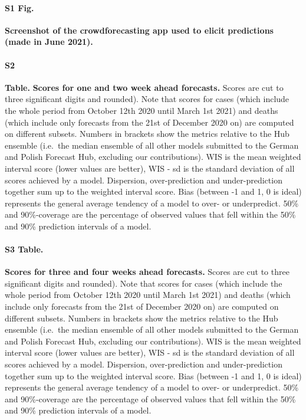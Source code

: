 \documentclass[10pt,letterpaper]{article}
\begin{document}
\paragraph*{S1 Fig.}
\label{fig:screenshot}

\textbf{Screenshot of the crowdforecasting app used to elicit predictions (made in June 2021).}

\paragraph*{S2}

\textbf{Table.} \label{tab:score-table-2}
\textbf{Scores for one and two week ahead forecasts.} Scores are cut to
three significant digits and rounded). Note that scores for cases (which
include the whole period from October 12th 2020 until March 1st 2021)
and deaths (which include only forecasts from the 21st of December 2020
on) are computed on different subsets. Numbers in brackets show the
metrics relative to the Hub ensemble (i.e.~the median ensemble of all
other models submitted to the German and Polish Forecast Hub, excluding
our contributions). WIS is the mean weighted interval score (lower
values are better), WIS - sd is the standard deviation of all scores
achieved by a model. Dispersion, over-prediction and under-prediction
together sum up to the weighted interval score. Bias (between -1 and 1,
0 is ideal) represents the general average tendency of a model to over-
or underpredict. 50\% and 90\%-coverage are the percentage of observed
values that fell within the 50\% and 90\% prediction intervals of a
model.

\paragraph*{S3 Table.}
\label{tab:score-table-4}

\textbf{Scores for three and four weeks ahead forecasts.} Scores are cut
to three significant digits and rounded). Note that scores for cases
(which include the whole period from October 12th 2020 until March 1st
2021) and deaths (which include only forecasts from the 21st of December
2020 on) are computed on different subsets. Numbers in brackets show the
metrics relative to the Hub ensemble (i.e.~the median ensemble of all
other models submitted to the German and Polish Forecast Hub, excluding
our contributions). WIS is the mean weighted interval score (lower
values are better), WIS - sd is the standard deviation of all scores
achieved by a model. Dispersion, over-prediction and under-prediction
together sum up to the weighted interval score. Bias (between -1 and 1,
0 is ideal) represents the general average tendency of a model to over-
or underpredict. 50\% and 90\%-coverage are the percentage of observed
values that fell within the 50\% and 90\% prediction intervals of a
model.
\end{document}
